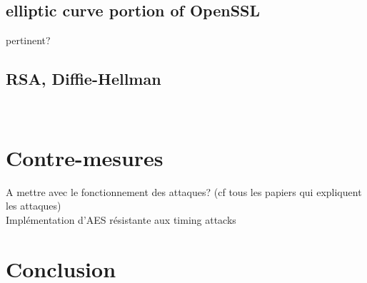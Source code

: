 \documentclass[a4paper,11pt]{article}
\begin{document}
\subsection{elliptic curve portion of OpenSSL}
pertinent?~\cite{brumley2009cache}

\subsection{RSA, Diffie-Hellman}
~\cite{kocher1996timing}

\section{Contre-mesures}
A mettre avec le fonctionnement des attaques? (cf tous les papiers qui expliquent les attaques)\\
Implémentation d'AES résistante aux timing attacks~\cite{kasper2009faster}

\section*{Conclusion}

\newpage
\nocite{*}


\end{document}
